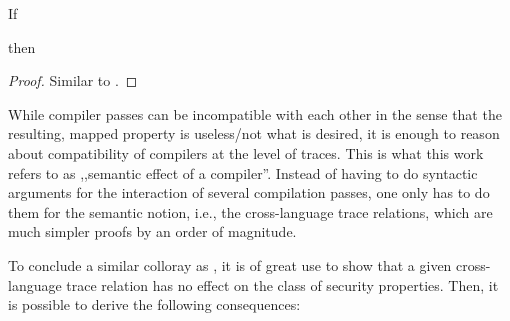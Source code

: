 \documentclass[a4paper,12pt]{article}
\begin{document}
\begin{lemma}[\Coqed]{}
  If 
  \begin{assumptions}
  \end{assumptions}
  then
  \begin{goals}
  \end{goals}
\end{lemma}
\begin{proof}
  Similar to .
\end{proof}

While compiler passes can be incompatible with each other in the sense that the resulting, mapped property is useless/not what is desired, it is enough to reason about compatibility of compilers at the level of traces.
This is what this work refers to as ,,semantic effect of a compiler''.
Instead of having to do syntactic arguments for the interaction of several compilation passes, one only has to do them for the semantic notion, i.e., the cross-language trace relations, which are much simpler proofs by an order of magnitude. 

To conclude a similar colloray as , it is of great use to show that a given cross-language trace relation has no effect on the class of security properties.
Then, it is possible to derive the following consequences:
\end{document}
